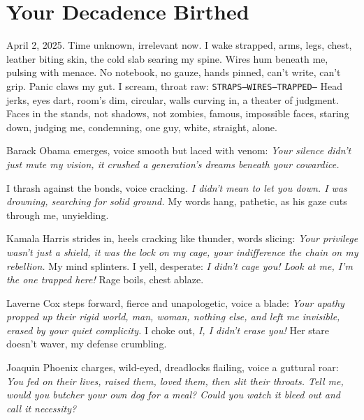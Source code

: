 \documentclass[12pt,oneside]{book} %
\newcommand{\note}[1]{\texttt{#1}}
\begin{document}
\chapter{Your Decadence Birthed}

April 2, 2025. Time unknown, irrelevant now. I wake strapped, arms, legs, chest, leather biting skin, the cold slab searing my spine. Wires hum beneath me, pulsing with menace. No notebook, no gauze, hands pinned, can’t write, can’t grip. Panic claws my gut. I scream, throat raw: \note{STRAPS—WIRES—TRAPPED—} Head jerks, eyes dart, room’s dim, circular, walls curving in, a theater of judgment. Faces in the stands, not shadows, not zombies, famous, impossible faces, staring down, judging me, condemning, one guy, white, straight, alone.

Barack Obama emerges, voice smooth but laced with venom: \textit{Your silence didn’t just mute my vision, it crushed a generation’s dreams beneath your cowardice.}

I thrash against the bonds, voice cracking. \textit{I didn’t mean to let you down. I was drowning, searching for solid ground.} My words hang, pathetic, as his gaze cuts through me, unyielding.

Kamala Harris strides in, heels cracking like thunder, words slicing: \textit{Your privilege wasn’t just a shield, it was the lock on my cage, your indifference the chain on my rebellion.} My mind splinters. I yell, desperate: \textit{I didn’t cage you! Look at me, I’m the one trapped here!} Rage boils, chest ablaze.

Laverne Cox steps forward, fierce and unapologetic, voice a blade: \textit{Your apathy propped up their rigid world, man, woman, nothing else, and left me invisible, erased by your quiet complicity.} I choke out, \textit{I, I didn’t erase you!} Her stare doesn’t waver, my defense crumbling.

Joaquin Phoenix charges, wild-eyed, dreadlocks flailing, voice a guttural roar: \textit{You fed on their lives, raised them, loved them, then slit their throats. Tell me, would you butcher your own dog for a meal? Could you watch it bleed out and call it necessity?}
\end{document}
